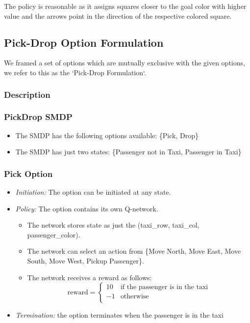 \documentclass[A4]{article}
\begin{document}
    The policy is reasonable as it assigns squares closer to the goal color with higher value
    and the arrows point in the direction of the respective colored square.

    \subsection{Pick-Drop Option Formulation}
    We framed a set of options which are mutually exclusive with the given options, we refer to this as the `Pick-Drop Formulation`.

    \subsubsection{Description}

    \subsubsection{PickDrop SMDP}
    \begin{itemize}
        \item The SMDP has the following options available: \{Pick, Drop\}
        \item The SMDP has just two states: \{Passenger not in Taxi, Passenger in Taxi\}
    \end{itemize}

    \subsubsection{Pick Option}
    \begin{itemize}
        \item \emph{Initiation:} The option can be initiated at any state.
        \item \emph{Policy:} The option contains its own Q-network.
        \begin{itemize}
            \item The network stores state as just the (taxi\_row, taxi\_col, passenger\_color).
            \item The network can select an action from \{Move North, Move East, Move South, Move West, Pickup Passenger\}.
            \item The network receives a reward as follows:
            \[
                \text{reward}= \left\{
                \begin{array}{ll}
                    10 & \text{if the passenger is in the taxi} \\
                    -1 & \text{otherwise}                       \\
                \end{array}
                \right.
            \]
        \end{itemize}
        \item \emph{Termination:} the option terminates when the passenger is in the taxi
    \end{itemize}
\end{document}
